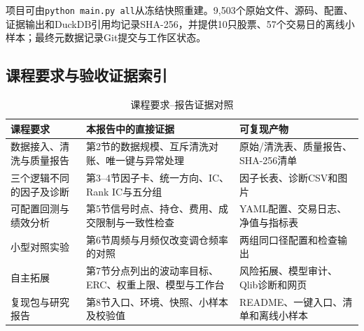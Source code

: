 \documentclass[10.5pt,a4paper]{ctexart}
\newcommand{\code}[1]{\texttt{\small #1}}
\begin{document}
项目可由\code{python main.py all}从冻结快照重建。9,503个原始文件、源码、配置、证据输出和DuckDB引用均记录SHA-256，并提供10只股票、57个交易日的离线小样本；最终元数据记录Git提交与工作区状态。

\subsection{课程要求与验收证据索引}
\begin{table}[H]\centering\footnotesize
\caption{课程要求--报告证据对照}\label{tab:requirement-map}
\begin{tabularx}{\textwidth}{p{3.1cm}Xp{3.4cm}}
\toprule 课程要求 & 本报告中的直接证据 & 可复现产物\\\midrule
数据接入、清洗与质量报告 & 第2节的数据规模、互斥清洗对账、唯一键与异常处理 & 原始/清洗表、质量报告、SHA-256清单\\
三个逻辑不同的因子及诊断 & 第3--4节因子卡、统一方向、IC、Rank IC与五分组 & 因子长表、诊断CSV和图片\\
可配置回测与绩效分析 & 第5节信号时点、持仓、费用、成交限制与一致性检查 & YAML配置、交易日志、净值与指标表\\
小型对照实验 & 第6节周频与月频仅改变调仓频率的对照 & 两组同口径配置和检查输出\\
自主拓展 & 第7节分点列出的波动率目标、ERC、权重上限、模型与工作台 & 风险拓展、模型审计、Qlib诊断和网页\\
复现包与研究报告 & 第8节入口、环境、快照、小样本及校验值 & README、一键入口、清单和离线小样本\\
\bottomrule
\end{tabularx}
\end{table}
\end{document}
